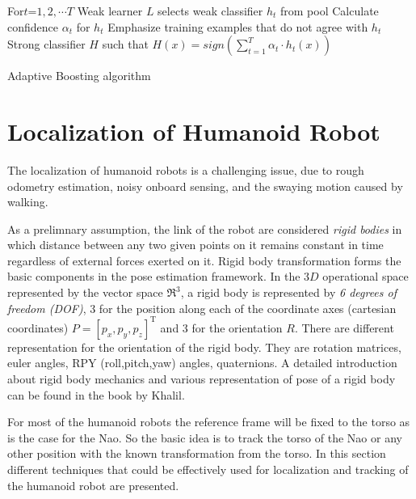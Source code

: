 \begin{algorithm}[H]
 \label{alg:adaboost}
For{$t$=$1,2,\cdots T$}{
	Weak learner $L$ selects weak classifier $h_t$ from pool\;
	Calculate confidence $\alpha_t$ for $h_t$\;
	Emphasize training examples that do not agree with $h_t$\;
}
\Return Strong classifier $H$ such that $H(x)=sign(\sum_{t=1}^{T}\alpha_t\cdot h_t(x))$
 \caption{Adaptive Boosting algorithm}
\end{algorithm}

\section{Localization of Humanoid Robot} %

		The localization of humanoid robots is a challenging issue, due to rough odometry estimation, noisy onboard sensing, and the swaying motion caused by walking\cite{cervera2012localization}. 
		 
		As a prelimnary assumption, the link of the robot are considered \emph{rigid bodies} in which distance between any two given points on it remains constant in time regardless of external forces exerted on it. Rigid body transformation forms the basic components in the pose estimation framework. In the $3D$ operational space represented by the vector space $\Re^3$, a rigid body is represented by \emph{6 degrees of freedom (DOF)}, 3 for the position along each of the coordinate axes (cartesian coordinates) $P = [p_x,p_y,p_z]^{\text{T}}$ and 3 for the orientation $R$. There are different representation for the orientation of the rigid body. They are rotation matrices, euler angles, RPY (roll,pitch,yaw) angles, quaternions. A detailed introduction about rigid body mechanics and various representation of pose of a rigid body can be found in the book by Khalil\cite{Khalil2002}.
		
		For most of the humanoid robots the reference frame will be fixed to the torso as is the case for the Nao. So the basic idea is to track the torso of the Nao or any other position with the known transformation from the torso. In this section different techniques that could be effectively used for localization and tracking of the humanoid robot are presented.
